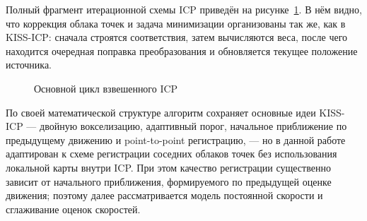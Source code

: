 Полный фрагмент итерационной схемы ICP приведён на рисунке~\ref{lst:icp-main-loop}. В нём видно, что коррекция облака точек и задача минимизации организованы так же, как в KISS-ICP: сначала строятся соответствия, затем вычисляются веса, после чего находится очередная поправка преобразования и обновляется текущее положение источника.

\begin{figure}
  \fontsize{12pt}{14pt}\selectfont
  
  \caption{Основной цикл взвешенного ICP}
  \label{lst:icp-main-loop}
\end{figure}

По своей математической структуре алгоритм сохраняет основные идеи KISS-ICP --- двойную вокселизацию, адаптивный порог, начальное приближение по предыдущему движению и point-to-point регистрацию, --- но в данной работе адаптирован к схеме регистрации соседних облаков точек без использования локальной карты внутри ICP. При этом качество регистрации существенно зависит от начального приближения, формируемого по предыдущей оценке движения; поэтому далее рассматривается модель постоянной скорости и сглаживание оценок скоростей.
